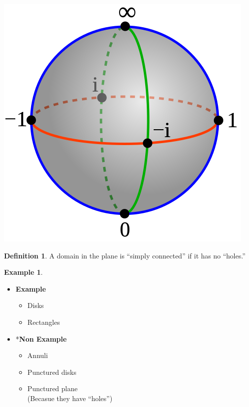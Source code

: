 \documentclass[
]{book}
\providecommand{\tightlist}{%
  \setlength{\itemsep}{0pt}\setlength{\parskip}{0pt}}
\theoremstyle{definition}
\newtheorem{definition}{Definition}[chapter]
\theoremstyle{definition}
\newtheorem{example}{Example}[chapter]
\theoremstyle{definition}
\theoremstyle{definition}
\theoremstyle{remark}
\begin{document}
\begin{center}\includegraphics[height=0.5\textheight]{figures/Mario_Bonk/fig2} \end{center}

\begin{definition}
\protect\hypertarget{def:unnamed-chunk-24}{}\label{def:unnamed-chunk-24}A domain in the plane is ``simply connected'' if it has no ``holes.''
\end{definition}

\begin{example}
\protect\hypertarget{exm:unnamed-chunk-25}{}\label{exm:unnamed-chunk-25}\leavevmode

\begin{itemize}
\tightlist
\item
  \textbf{Example}

  \begin{itemize}
  \tightlist
  \item
    Disks
  \item
    Rectangles
  \end{itemize}
\item
  *\textbf{Non Example}

  \begin{itemize}
  \tightlist
  \item
    Annuli
  \item
    Punctured disks
  \item
    Punctured plane\\
    (Becasue they have ``holes'')
  \end{itemize}
\end{itemize}

\end{example}
\end{document}
